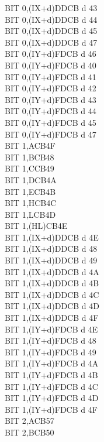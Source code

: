 \documentclass[12pt,twoside,openright,a4paper]{book}
\begin{document}
\begin{multicols}{3}
{\begin{tabbing}
		BIT 0,(IX+d)\UNDOC\>DDCB d 43\\
		BIT 0,(IX+d)\UNDOC\>DDCB d 44\\
		BIT 0,(IX+d)\UNDOC\>DDCB d 45\\
		BIT 0,(IX+d)\UNDOC\>DDCB d 47\\
		BIT 0,(IY+d)\>FDCB d 46\\
		BIT 0,(IY+d)\UNDOC\>FDCB d 40\\
		BIT 0,(IY+d)\UNDOC\>FDCB d 41\\
		BIT 0,(IY+d)\UNDOC\>FDCB d 42\\
		BIT 0,(IY+d)\UNDOC\>FDCB d 43\\
		BIT 0,(IY+d)\UNDOC\>FDCB d 44\\
		BIT 0,(IY+d)\UNDOC\>FDCB d 45\\
		BIT 0,(IY+d)\UNDOC\>FDCB d 47\\
		BIT 1,A\>CB4F\\
		BIT 1,B\>CB48\\
		BIT 1,C\>CB49\\
		BIT 1,D\>CB4A\\
		BIT 1,E\>CB4B\\
		BIT 1,H\>CB4C\\
		BIT 1,L\>CB4D\\
		BIT 1,(HL)\>CB4E\\
		BIT 1,(IX+d)\>DDCB d 4E\\
		BIT 1,(IX+d)\UNDOC\>DDCB d 48\\
		BIT 1,(IX+d)\UNDOC\>DDCB d 49\\
		BIT 1,(IX+d)\UNDOC\>DDCB d 4A\\
		BIT 1,(IX+d)\UNDOC\>DDCB d 4B\\
		BIT 1,(IX+d)\UNDOC\>DDCB d 4C\\
		BIT 1,(IX+d)\UNDOC\>DDCB d 4D\\
		BIT 1,(IX+d)\UNDOC\>DDCB d 4F\\
		BIT 1,(IY+d)\>FDCB d 4E\\
		BIT 1,(IY+d)\UNDOC\>FDCB d 48\\
		BIT 1,(IY+d)\UNDOC\>FDCB d 49\\
		BIT 1,(IY+d)\UNDOC\>FDCB d 4A\\
		BIT 1,(IY+d)\UNDOC\>FDCB d 4B\\
		BIT 1,(IY+d)\UNDOC\>FDCB d 4C\\
		BIT 1,(IY+d)\UNDOC\>FDCB d 4D\\
		BIT 1,(IY+d)\UNDOC\>FDCB d 4F\\
		BIT 2,A\>CB57\\
		BIT 2,B\>CB50\\

\end{tabbing}}
\end{multicols}
\end{document}
